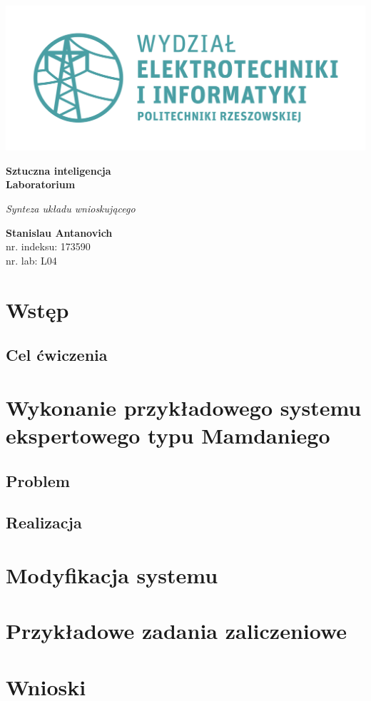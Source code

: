 \documentclass[a4paper, 10pt]{article}
\begin{document}
\begin{titlepage}
\begin{center}
	\includegraphics[scale=0.7]{logo.png}

	\vspace*{4cm}
	\textbf{Sztuczna inteligencja\\ Laboratorium}

	\vspace{1.5cm}
	\textit{Synteza układu wnioskującego}

	\vspace{1.5cm}
	\textbf{Stanislau Antanovich}\\
	nr. indeksu: 173590\\
	nr. lab: L04
\end{center}
\end{titlepage}

\tableofcontents
\listoffigures

\newpage
\section{Wstęp}
\subsection{Cel ćwiczenia}

\section{Wykonanie przykładowego systemu ekspertowego typu Mamdaniego}
\subsection{Problem}
\subsection{Realizacja}

\section{Modyfikacja systemu}

\section{Przykładowe zadania zaliczeniowe}

\section{Wnioski}
\end{document}
